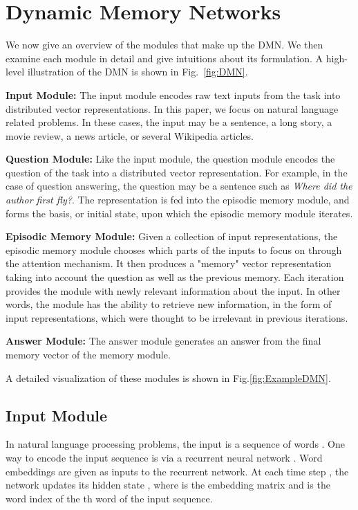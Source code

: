 \documentclass{article}
\begin{document}
\section{Dynamic Memory Networks}
We now give an overview of the modules that make up the DMN. We then examine each module in detail and give intuitions about its formulation. A high-level illustration of the DMN is shown in Fig.~\ref{fig:DMN}.

\textbf{Input Module:}
The input module encodes raw text inputs from the task into distributed vector representations. In this paper, we focus on natural language related problems. In these cases, the input may be a sentence, a long story, a movie review, a news article, or several Wikipedia articles.

\textbf{Question Module:}
Like the input module, the question module encodes the question of the task into a distributed vector representation. For example, in the case of question answering, the question may be a sentence such as \emph{Where did the author first fly?}. The representation is fed into the episodic memory module, and forms the basis, or initial state, upon which the episodic memory module iterates.

\textbf{Episodic Memory Module:}
Given a collection of input representations, the episodic memory module chooses which parts of the inputs to focus on through the attention mechanism. It then produces a "memory" vector representation taking into account the question as well as the previous memory. Each iteration provides the module with newly relevant information about the input. In other words, the module has the ability to retrieve new information, in the form of input representations, which were thought to be irrelevant in previous iterations.

\textbf{Answer Module:} The answer module generates an answer from the final memory vector of the memory module.

A detailed visualization of these modules is shown in Fig.\ref{fig:ExampleDMN}.

\subsection{Input Module}\label{section:input}
In natural language processing problems, the input is a sequence of  words . One way to encode the input sequence is via a recurrent neural network \cite{Elman1991}. Word embeddings are given as inputs to the recurrent network. At each time step , the network updates its hidden state , where  is the embedding matrix and  is the word index of the th word of the input sequence.
\end{document}
